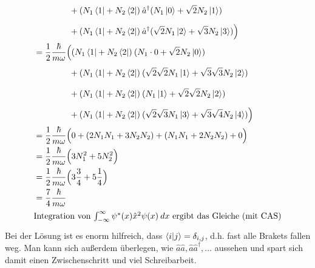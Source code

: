 \documentclass{scrartcl}
\begin{document}
\begin{enumerate}[a)]
\begin{align*}
				&\phantom{=\frac 12 \frac{\hbar}{m\omega} \Big(}
					+ (N_1 \bra 1 + N_2 \bra 2)\:\hat a^\dagger(N_1\ket 0 +\sqrt 2 N_2\ket 1) \\
				&\phantom{=\frac 12 \frac{\hbar}{m\omega} \Big(}
					+ (N_1 \bra 1 + N_2 \bra 2)\:\hat a^\dagger(\sqrt 2 N_1\ket 2 + \sqrt 3 N_2\ket 3) \Big)\\
				&=  \frac 12 \frac{\hbar}{m\omega} \Big(
					(N_1 \bra 1 + N_2 \bra 2)\:(N_1\cdot 0  + \sqrt 2 N_2\ket 0) \\
				&\phantom{=\frac 12 \frac{\hbar}{m\omega} \Big(}
					+ (N_1 \bra 1 + N_2 \bra 2)\:(\sqrt 2 \sqrt 2 N_1\ket 1 + \sqrt 3 \sqrt 3 N_2\ket 2) \\
				&\phantom{=\frac 12 \frac{\hbar}{m\omega} \Big(}
					+ (N_1 \bra 1 + N_2 \bra 2)\:(N_1\ket 1 +\sqrt 2 \sqrt 2  N_2\ket 2) \\
				&\phantom{=\frac 12 \frac{\hbar}{m\omega} \Big(}
					+ (N_1 \bra 1 + N_2 \bra 2)\:(\sqrt 2 \sqrt 3 N_1\ket 3 + \sqrt 3 \sqrt 4 N_2\ket 4) \Big) \\
				&=  \frac 12 \frac{\hbar}{m\omega} \Big( 0 + (2 N_1 N_1 + 3 N_2 N_2)  + (N_1 N_1 + 2 N_2 N_2) + 0\Big) \\
				&=  \frac 12 \frac{\hbar}{m\omega} \Big( 3 N_1^2 + 5 N_2^2\Big) \\
				&=  \frac 12 \frac{\hbar}{m\omega} \Big( 3 \frac 34 + 5 \frac 14 \Big) \\
				&=  \frac 74 \frac{\hbar}{m\omega}\\
\intertext{Integration von $\int_{-\infty}^{\infty} \psi^\ast(x) \hat x^2 \psi(x)\:dx$ ergibt das Gleiche (mit CAS)}
\end{align*}
Bei der Lösung ist es enorm hilfreich, dass $\braket{i|j} = \delta_{i,j}$, d.h. fast alle Brakets fallen weg. Man kann sich außerdem überlegen, wie $\hat a \hat a, \hat a\hat a^\dagger, \dots$ aussehen und spart sich damit einen Zwischenschritt und viel Schreibarbeit.


\end{enumerate}
\end{document}
